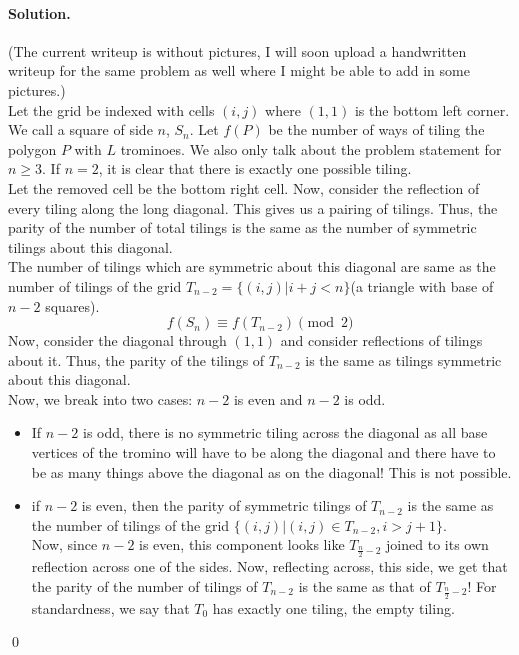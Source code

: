 \documentclass[12pt]{article}
\newenvironment{solution}
{\paragraph{Solution.}}
{\qed\eject}
\begin{document}
\begin{solution}
    (The current writeup is without pictures, I will soon upload a handwritten writeup for the same problem as well where I might be able to add in some pictures.)\\

    Let the grid be indexed with cells $(i,j)$ where $(1,1)$ is the bottom left corner. We call a square of side $n$, $S_n$. Let $f(P)$ be the number of ways of tiling the polygon $P$ with $L$ trominoes. We also only talk about the problem statement for $n\ge 3$. If $n=2$, it is clear that there is exactly one possible tiling.\\

    Let the removed cell be the bottom right cell. Now, consider the reflection of every tiling along the long diagonal. This gives us a pairing of tilings. Thus, the parity of the number of total tilings is the same as the number of symmetric tilings about this diagonal. \\

    The number of tilings which are symmetric about this diagonal are same as the number of tilings of the grid $T_{n-2}=\{(i,j)|i+j<n\}$(a triangle with base of $n-2$ squares).\\
        \[f(S_n)\equiv f(T_{n-2})\pmod{2}\]
    Now, consider the diagonal through $(1,1)$ and consider reflections of tilings about it. Thus, the parity of the tilings of $T_{n-2}$ is the same as tilings symmetric about this diagonal.\\

    Now, we break into two cases: $n-2$ is even and $n-2$ is odd.

    \begin{itemize}
        \item If $n-2$ is odd, there is no symmetric tiling across the diagonal as all base vertices of the tromino will have to be along the diagonal and there have to be as many things above the diagonal as on the diagonal! This is not possible.
        \item if $n-2$ is even, then the parity of symmetric tilings of $T_{n-2}$ is the same as the number of tilings of the grid $\{(i,j)|(i,j)\in T_{n-2}, i>j+1\}$.\\
              Now, since $n-2$ is even, this component looks like $T_{\frac{n}{2}-2}$ joined to its own reflection across one of the sides. Now, reflecting across, this side, we get that the parity of the number of tilings of $T_{n-2}$ is the same as that of $T_{\frac{n}{2}-2}$!
        For standardness, we say that $T_0$ has exactly one tiling, the empty tiling.
    \end{itemize}


\end{solution}
\end{document}
